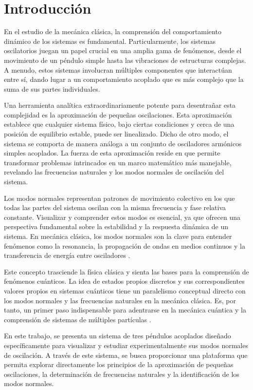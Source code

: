 \section{Introducción}

En el estudio de la mec\'anica cl\'asica, la comprensi\'on del
comportamiento din\'amico de los sistemas es fundamental.
Particularmente, los sistemas oscilatorios juegan un papel
crucial en una amplia gama de fen\'omenos, desde el movimiento
de un p\'endulo simple hasta las vibraciones de estructuras
complejas.
A menudo, estos sistemas involucran m\'ultiples componentes que interact\'uan
entre s\'i, dando lugar a un comportamiento acoplado que es m\'as complejo que
la suma de sus partes individuales.

Una herramienta anal\'itica extraordinariamente potente para
desentra\~nar esta complejidad es la aproximaci\'on
de peque\~nas oscilaciones.
Esta aproximaci\'on establece que cualquier sistema f\'isico, bajo ciertas
condiciones y cerca de una posici\'on de equilibrio estable, puede ser
linealizado.
Dicho de otro modo, el sistema se comporta de manera an\'aloga a un conjunto de
osciladores arm\'onicos simples acoplados.
La fuerza de esta aproximaci\'on reside en que permite transformar problemas
intrincados en un marco matem\'atico m\'as manejable, revelando las frecuencias
naturales y los modos normales de oscilaci\'on del sistema.

Los modos normales representan patrones de movimiento colectivo en los que todas
las partes del sistema oscilan con la misma frecuencia y fase relativa constante.
Visualizar y comprender estos modos es esencial, ya que ofrecen una perspectiva
fundamental sobre la estabilidad y la respuesta din\'amica de un sistema.
En mec\'anica cl\'asica, los modos normales son la clave para entender fen\'omenos
como la resonancia, la propagaci\'on de ondas en medios continuos y la
transferencia de energ\'ia entre osciladores \cite{Goldstein}.

Este concepto trasciende la f\'isica cl\'asica y sienta las bases para la
comprensi\'on de fen\'omenos cu\'anticos.
La idea de estados propios discretos y sus correspondientes valores propios en
sistemas cu\'anticos tiene un paralelismo conceptual directo con los modos
normales y las frecuencias naturales en la mec\'anica cl\'asica.
Es, por tanto, un primer paso indispensable para adentrarse en la mec\'anica
cu\'antica y la comprensi\'on de sistemas de m\'ultiples part\'iculas
\cite{Griffiths2017}.

En este trabajo, se presenta un sistema de tres p\'endulos acoplados dise\~nado
espec\'ificamente para visualizar y estudiar experimentalmente sus modos normales
de oscilaci\'on.
A trav\'es de este sistema, se busca proporcionar una plataforma que permita
explorar directamente los principios de la aproximaci\'on de peque\~nas
oscilaciones, la determinaci\'on de frecuencias naturales y la identificaci\'on
de los modos normales.
